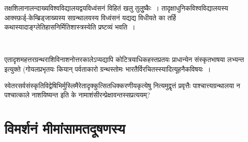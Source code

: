 \eject

तक्षशिलानालन्दाख्यविश्वविद्यालयद्वयविध्वंसनं विहितं खलु तुलुुष्कैः~। तादृक्षाधुनिकविश्वविद्यालयस्य आक्स्फ़र्ड्-केम्ब्रिड्जाख्यस्य सग्रन्थालयस्य विध्वंसनं यद्यद्य विधीयते का तर्हि कथा\break स्यादाङ्ग्लेतिहासनिर्मितिशास्त्रस्येति प्रष्टव्यं भवति~।

\begin{myquote}

~\hfill {} 
\end{myquote}

एतादृशमहत्तरग्रन्थराशिविनाशनोत्तरकालेऽप्यद्यापि कोटित्रयाधिकहस्तप्रतयः प्राधान्येन संस्कृतभाषया लभ्यन्त इत्युक्ते (गोयलप्रभृतयः  कियान् पर्वताकारो ग्रन्थस्तोमः भारतैर्विरचितस्स्यादित्यूहनैकविषयः~।

स्वेतरसर्वसंस्कृतिविद्वेषिभिर्मुस्लिमैरेतादृक्कुत्सितधिक्करणीयकृत्येषु नित्यमुद्वृत्तं प्रवृत्तैः पाश्चात्त्यग्रन्थालया न पश्चात्काले नाशयिष्यन्त इति के नामाशंसीरन्प्रेक्षावन्तस्सप्रत्ययम्?

\vspace{-.35cm}

\section*{विमर्शनं मीमांसामतदूषणस्य}

